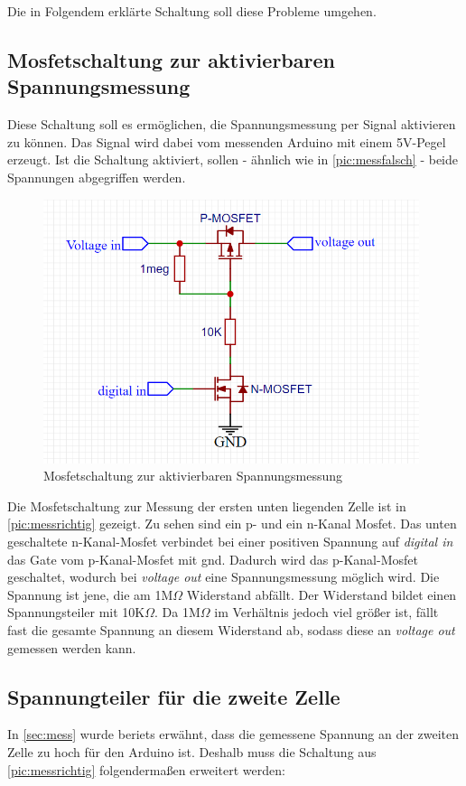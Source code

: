 Die in Folgendem erklärte Schaltung soll diese Probleme umgehen.
\subsection{Mosfetschaltung zur aktivierbaren Spannungsmessung}
Diese Schaltung soll es ermöglichen, die Spannungsmessung per Signal aktivieren zu können. Das Signal wird dabei vom messenden Arduino mit einem 5V-Pegel erzeugt. Ist die Schaltung aktiviert, sollen - ähnlich wie in \autoref{pic:messfalsch} - beide Spannungen abgegriffen werden.

\begin{figure}[h]
	\begin{center}
		\includegraphics[width=11cm]{messRichtig.PNG}
		\caption{\label{pic:messrichtig} Mosfetschaltung zur aktivierbaren Spannungsmessung}
	\end{center}
\end{figure}

Die Mosfetschaltung zur Messung der ersten unten liegenden Zelle ist in \autoref{pic:messrichtig} gezeigt.
Zu sehen sind ein p- und ein n-Kanal Mosfet. Das unten geschaltete n-Kanal-Mosfet verbindet bei einer positiven Spannung auf \textit{digital in} das Gate vom p-Kanal-Mosfet mit \gls{gnd}. Dadurch wird das p-Kanal-Mosfet geschaltet, wodurch bei \textit{voltage out} eine Spannungsmessung möglich wird. Die Spannung ist jene, die am 1M$\Omega$ Widerstand abfällt. Der Widerstand bildet einen Spannungsteiler mit 10K$\Omega$. Da 1M$\Omega$ im Verhältnis jedoch viel größer ist, fällt fast die gesamte Spannung an diesem Widerstand ab, sodass diese an \textit{voltage out} gemessen werden kann.

\subsection{Spannungteiler für die zweite Zelle}
In \autoref{sec:mess} wurde beriets erwähnt, dass die gemessene Spannung an der zweiten Zelle zu hoch für den Arduino ist. Deshalb muss die Schaltung aus \autoref{pic:messrichtig} folgendermaßen erweitert werden:

